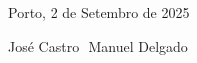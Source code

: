 \documentclass[12pt]{amsart}
\numberwithin{table}{section}
\numberwithin{figure}{section}
\numberwithin{equation}{section}
\DeclareMathOperator{\multiplicityoper}{m} %
\DeclareMathOperator{\primitivesoper}{P} %
\newtheorem{theorem}{Theorem}[section] %
\theoremstyle{definition}
\theoremstyle{remark}
\newtheorem{problem}[theorem]{Problem}
\begin{document}
% 
%
%
%	

\printbibliography
% 
%
\bigskip

Porto, 2 de Setembro de 2025
\bigskip

\hfill
José Castro
\hfill\( \)\hfill
Manuel Delgado
\hfill \( \)
\vfill
\end{document}
